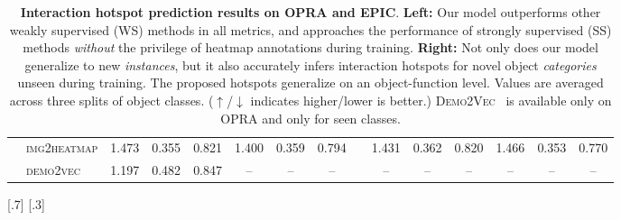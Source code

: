 \documentclass[10pt,twocolumn,letterpaper]{article}
\newcommand{\SC}[1]{{\textsc{#1}}}
\begin{document}
\begin{table*}[t]
{\begin{tabular}{rl|ccc|ccc|c@{\hskip 0.1in}|ccc|ccc|}
\ldelim[{2}{1mm}[{\rotatebox[origin=c]{90}{SS}}]
& \SC{img2heatmap}                       & 1.473            & 0.355          & 0.821            & 1.400            & 0.359          & 0.794            && 1.431            & 0.362          & 0.820           & 1.466           & 0.353          & 0.770             \\ 
& \SC{demo2vec} \cite{fang2018demo2vec}  & 1.197            & 0.482          & 0.847            & --               & --             & --               && --               & --             & --              & --              & --             & --                \\ 
\cmidrule{2-8} \cmidrule{10-15}
\end{tabular}
}
\vskip -0.1in
[.7\linewidth]{}  \hskip -0.7in
[.3\linewidth]{} \vskip -0.1in

\caption{\textbf{Interaction hotspot prediction results on OPRA and EPIC}. \textbf{Left:} Our model outperforms other weakly supervised (WS) methods in all metrics, and approaches the performance of strongly supervised (SS) methods \emph{without} the privilege of heatmap annotations during training. \textbf{Right:} Not only does our model generalize to new \emph{instances}, but it also accurately infers interaction hotspots for novel object \emph{categories} unseen during training. The proposed hotspots generalize on an object-function level. Values are averaged across three splits of object classes. ($\uparrow$/$\downarrow$ indicates higher/lower is better.)  \SC{Demo2Vec}~\cite{fang2018demo2vec} is available only on OPRA and only for seen classes.}

\label{tbl:hotspot-eval}
\end{table*}
\end{document}
